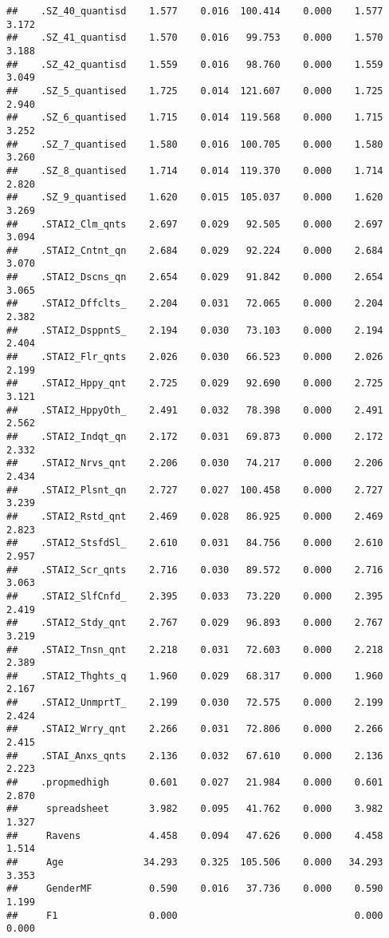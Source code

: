 \documentclass[]{article}
\begin{document}
\begin{verbatim}
##    .SZ_40_quantisd    1.577    0.016  100.414    0.000    1.577    3.172
##    .SZ_41_quantisd    1.570    0.016   99.753    0.000    1.570    3.188
##    .SZ_42_quantisd    1.559    0.016   98.760    0.000    1.559    3.049
##    .SZ_5_quantised    1.725    0.014  121.607    0.000    1.725    2.940
##    .SZ_6_quantised    1.715    0.014  119.568    0.000    1.715    3.252
##    .SZ_7_quantised    1.580    0.016  100.705    0.000    1.580    3.260
##    .SZ_8_quantised    1.714    0.014  119.370    0.000    1.714    2.820
##    .SZ_9_quantised    1.620    0.015  105.037    0.000    1.620    3.269
##    .STAI2_Clm_qnts    2.697    0.029   92.505    0.000    2.697    3.094
##    .STAI2_Cntnt_qn    2.684    0.029   92.224    0.000    2.684    3.070
##    .STAI2_Dscns_qn    2.654    0.029   91.842    0.000    2.654    3.065
##    .STAI2_Dffclts_    2.204    0.031   72.065    0.000    2.204    2.382
##    .STAI2_DsppntS_    2.194    0.030   73.103    0.000    2.194    2.404
##    .STAI2_Flr_qnts    2.026    0.030   66.523    0.000    2.026    2.199
##    .STAI2_Hppy_qnt    2.725    0.029   92.690    0.000    2.725    3.121
##    .STAI2_HppyOth_    2.491    0.032   78.398    0.000    2.491    2.562
##    .STAI2_Indqt_qn    2.172    0.031   69.873    0.000    2.172    2.332
##    .STAI2_Nrvs_qnt    2.206    0.030   74.217    0.000    2.206    2.434
##    .STAI2_Plsnt_qn    2.727    0.027  100.458    0.000    2.727    3.239
##    .STAI2_Rstd_qnt    2.469    0.028   86.925    0.000    2.469    2.823
##    .STAI2_StsfdSl_    2.610    0.031   84.756    0.000    2.610    2.957
##    .STAI2_Scr_qnts    2.716    0.030   89.572    0.000    2.716    3.063
##    .STAI2_SlfCnfd_    2.395    0.033   73.220    0.000    2.395    2.419
##    .STAI2_Stdy_qnt    2.767    0.029   96.893    0.000    2.767    3.219
##    .STAI2_Tnsn_qnt    2.218    0.031   72.603    0.000    2.218    2.389
##    .STAI2_Thghts_q    1.960    0.029   68.317    0.000    1.960    2.167
##    .STAI2_UnmprtT_    2.199    0.030   72.575    0.000    2.199    2.424
##    .STAI2_Wrry_qnt    2.266    0.031   72.806    0.000    2.266    2.415
##    .STAI_Anxs_qnts    2.136    0.032   67.610    0.000    2.136    2.223
##    .propmedhigh       0.601    0.027   21.984    0.000    0.601    2.870
##     spreadsheet       3.982    0.095   41.762    0.000    3.982    1.327
##     Ravens            4.458    0.094   47.626    0.000    4.458    1.514
##     Age              34.293    0.325  105.506    0.000   34.293    3.353
##     GenderMF          0.590    0.016   37.736    0.000    0.590    1.199
##     F1                0.000                               0.000    0.000

\end{verbatim}
\end{document}
